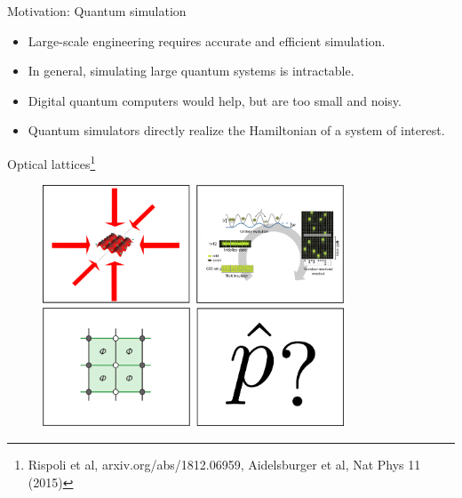 \documentclass{beamer}
\begin{document}
\begin{frame}{Motivation: Quantum simulation}
    \begin{itemize}
        \item Large-scale engineering requires accurate and efficient simulation.
        \item In general, simulating large quantum systems is intractable.
        \item Digital quantum computers would help, but are too small and noisy.
        \item Quantum simulators directly realize the Hamiltonian of a system of interest.
    \end{itemize}
\end{frame}

\begin{frame}{Optical lattices\footnote[frame]{Rispoli et al, arxiv.org/abs/1812.06959, Aidelsburger et al, Nat Phys 11 (2015)}}
    \begin{figure}
        \centering
        \includegraphics[width=0.8\textwidth]{figures/Lattice/lattice_tech.png}
        \label{fig:my_label}
    \end{figure}
\end{frame}
\end{document}
